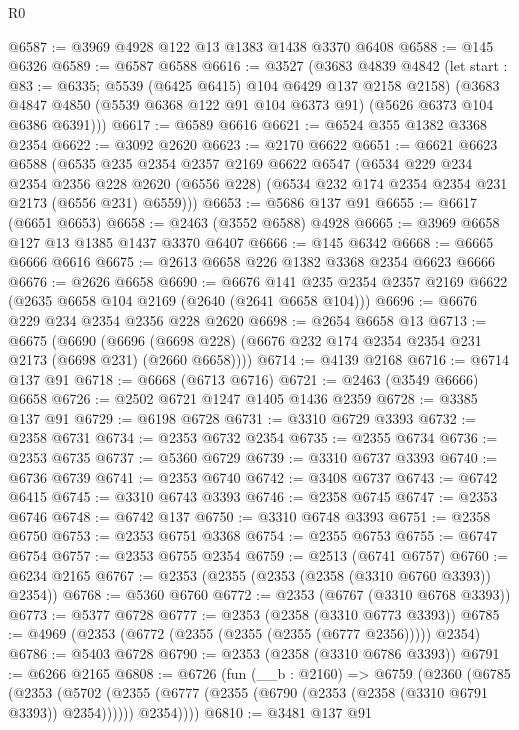 \begin{lexlean}{R0}
\begin{coremodule}
@6587 := @3969 @4928 @122 @13 @1383 @1438 @3370 @6408
@6588 := @145 @6326
@6589 := @6587 @6588
@6616 := @3527
    (@3683
      @4839
      @4842
      (let start : @83 := @6335; @5539 (@6425 @6415) @104 @6429 @137 @2158 @2158)
      (@3683 @4847 @4850 (@5539 @6368 @122 @91 @104 @6373 @91) (@5626 @6373 @104 @6386 @6391)))
@6617 := @6589 @6616
@6621 := @6524 @355 @1382 @3368 @2354
@6622 := @3092 @2620
@6623 := @2170 @6622
@6651 := @6621
    @6623
    @6588
    (@6535
      @235
      @2354
      @2357
      @2169
      @6622
      @6547
      (@6534
        @229
        @234
        @2354
        @2356
        @228
        @2620
        (@6556 @228)
        (@6534 @232 @174 @2354 @2354 @231 @2173 (@6556 @231) @6559)))
@6653 := @5686 @137 @91
@6655 := @6617 (@6651 @6653)
@6658 := @2463 (@3552 @6588) @4928
@6665 := @3969 @6658 @127 @13 @1385 @1437 @3370 @6407
@6666 := @145 @6342
@6668 := @6665 @6666 @6616
@6675 := @2613 @6658 @226 @1382 @3368 @2354 @6623 @6666
@6676 := @2626 @6658
@6690 := @6676 @141 @235 @2354 @2357 @2169 @6622 (@2635 @6658 @104 @2169 (@2640 (@2641 @6658 @104)))
@6696 := @6676 @229 @234 @2354 @2356 @228 @2620
@6698 := @2654 @6658 @13
@6713 := @6675
    (@6690 (@6696 (@6698 @228) (@6676 @232 @174 @2354 @2354 @231 @2173 (@6698 @231) (@2660 @6658))))
@6714 := @4139 @2168
@6716 := @6714 @137 @91
@6718 := @6668 (@6713 @6716)
@6721 := @2463 (@3549 @6666) @6658
@6726 := @2502 @6721 @1247 @1405 @1436 @2359
@6728 := @3385 @137 @91
@6729 := @6198 @6728
@6731 := @3310 @6729 @3393
@6732 := @2358 @6731
@6734 := @2353 @6732 @2354
@6735 := @2355 @6734
@6736 := @2353 @6735
@6737 := @5360 @6729
@6739 := @3310 @6737 @3393
@6740 := @6736 @6739
@6741 := @2353 @6740
@6742 := @3408 @6737
@6743 := @6742 @6415
@6745 := @3310 @6743 @3393
@6746 := @2358 @6745
@6747 := @2353 @6746
@6748 := @6742 @137
@6750 := @3310 @6748 @3393
@6751 := @2358 @6750
@6753 := @2353 @6751 @3368
@6754 := @2355 @6753
@6755 := @6747 @6754
@6757 := @2353 @6755 @2354
@6759 := @2513 (@6741 @6757)
@6760 := @6234 @2165
@6767 := @2353 (@2355 (@2353 (@2358 (@3310 @6760 @3393)) @2354))
@6768 := @5360 @6760
@6772 := @2353 (@6767 (@3310 @6768 @3393))
@6773 := @5377 @6728
@6777 := @2353 (@2358 (@3310 @6773 @3393))
@6785 := @4969 (@2353 (@6772 (@2355 (@2355 (@2355 (@6777 @2356))))) @2354)
@6786 := @5403 @6728
@6790 := @2353 (@2358 (@3310 @6786 @3393))
@6791 := @6266 @2165
@6808 := @6726
    (fun (__b : @2160) =>
    @6759
      (@2360
        (@6785
          (@2353
            (@5702 (@2355 (@6777 (@2355 (@6790 (@2353 (@2358 (@3310 @6791 @3393)) @2354))))))
            @2354))))
@6810 := @3481 @137 @91

\end{coremodule}
\end{lexlean}

